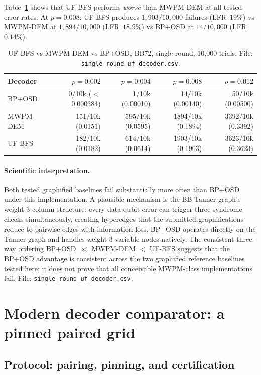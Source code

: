 \documentclass[11pt,a4paper]{article}
\begin{document}
Table~\ref{tab:uf} shows that UF-BFS performs \emph{worse} than MWPM-DEM
at all tested error rates.
At $p=0.008$: UF-BFS produces $1{,}903/10{,}000$ failures (LFR~$19\%$)
vs MWPM-DEM at $1{,}894/10{,}000$ (LFR~$18.9\%$) vs BP+OSD at $14/10{,}000$
(LFR~$0.14\%$).

\begin{table}[H]\centering\small
\caption{UF-BFS vs MWPM-DEM vs BP+OSD, BB72, single-round, 10{,}000 trials.
  File: \texttt{single\_round\_uf\_decoder.csv}.}
\label{tab:uf}
\begin{tabular}{@{}lrrrr@{}}
\toprule
Decoder & $p=0.002$ & $p=0.004$ & $p=0.008$ & $p=0.012$ \\
\midrule
BP+OSD   & 0/10k ($<$0.000384) & 1/10k (0.00010) & 14/10k (0.00140) & 50/10k (0.00500) \\
MWPM-DEM & 151/10k (0.0151) & 595/10k (0.0595) & 1894/10k (0.1894) & 3392/10k (0.3392) \\
UF-BFS   & 182/10k (0.0182) & 614/10k (0.0614) & 1903/10k (0.1903) & 3623/10k (0.3623) \\
\bottomrule
\end{tabular}
\end{table}

\paragraph{Scientific interpretation.}
Both tested graphified baselines fail substantially more often than BP+OSD under this implementation.
A plausible mechanism is the BB Tanner graph's weight-3 column structure: every data-qubit error can trigger three syndrome checks simultaneously, creating hyperedges that the submitted graphifications reduce to pairwise edges with information loss.
BP+OSD operates directly on the Tanner graph and handles weight-3
variable nodes natively.
The consistent three-way ordering BP+OSD $\ll$ MWPM-DEM $<$ UF-BFS
suggests that the BP+OSD advantage is consistent across the two graphified
reference baselines tested here; it does not prove that all conceivable
MWPM-class implementations fail.
File: \texttt{single\_round\_uf\_decoder.csv}.

\section{Modern decoder comparator: a pinned paired grid}
\label{sec:comparator}

\subsection{Protocol: pairing, pinning, and certification}
\end{document}
